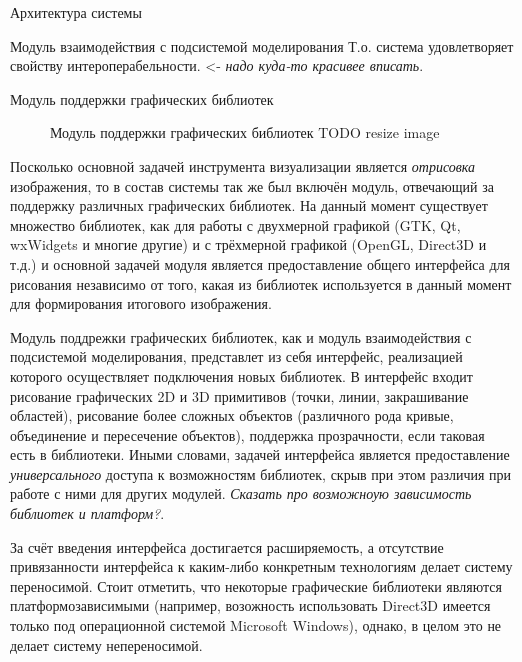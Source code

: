 \documentclass[a4paper,12pt]{extarticle}
\begin{document}
\begin{section}{Архитектура системы}
\begin{subsection}{Модуль взаимодействия с подсистемой моделирования}
    Т.о. система удовлетворяет свойству интероперабельности. <- \textit{надо куда-то красивее вписать}.
\end{subsection}

\begin{subsection}{Модуль поддержки графических библиотек}
    \begin{figure}[h]
        \caption{Модуль поддержки графических библиотек TODO resize image}
        \label{ris:architecture-graphics}
    \end{figure}
    
    Посколько основной задачей инструмента визуализации является \textit{отрисовка} изображения, то в состав системы так же был включён модуль, отвечающий за поддержку различных графических библиотек. На данный момент существует множество библиотек, как для работы с двухмерной графикой (GTK, Qt, wxWidgets и многие другие) и с трёхмерной графикой (OpenGL, Direct3D и т.д.) и основной задачей модуля является предоставление общего интерфейса для рисования независимо от того, какая из библиотек используется в данный момент для формирования итогового изображения.

    Модуль поддрежки графических библиотек, как и модуль взаимодействия с подсистемой моделирования, представлет из себя интерфейс, реализацией которого осуществляет подключения новых библиотек. В интерфейс входит рисование графических 2D и 3D примитивов (точки, линии, закрашивание областей), рисование более сложных объектов (различного рода кривые, объединение и пересечение объектов), поддержка прозрачности, если таковая есть в библиотеки. Иными словами, задачей интерфейса является предоставление \textit{универсального} доступа к возможностям библиотек, скрыв при этом различия при работе с ними для других модулей. \textit{Сказать про возможноую зависимость библиотек и платформ?}.

    За счёт введения интерфейса достигается расширяемость, а отсутствие привязанности интерфейса к каким-либо конкретным технологиям делает систему переносимой. Стоит отметить, что некоторые графические библиотеки являются платформозависимыми (например, возожность использовать Direct3D имеется только под операционной системой Microsoft Windows), однако, в целом это не делает систему непереносимой.


\end{subsection}
\end{section}
\end{document}
